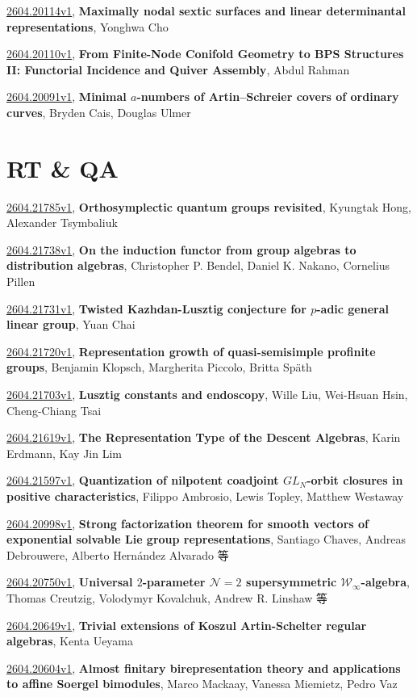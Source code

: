 \documentclass[9pt, a4paper]{article}
\theoremstyle{plain}
\theoremstyle{definition}
\theoremstyle{remark}
\newcommand{\arxiv}[3]{\href{https://arxiv.org/abs/#1}{#1}, \textbf{\textcolor{arxivblue}{#2}}, #3}
\begin{document}
\arxiv{2604.20114v1}{Maximally nodal sextic surfaces and linear determinantal representations}{Yonghwa Cho}

\arxiv{2604.20110v1}{From Finite-Node Conifold Geometry to BPS Structures II: Functorial Incidence and Quiver Assembly}{Abdul Rahman}

\arxiv{2604.20091v1}{Minimal $a$-numbers of Artin--Schreier covers of ordinary curves}{Bryden Cais, Douglas Ulmer}


\section{RT \& QA}
\arxiv{2604.21785v1}{Orthosymplectic quantum groups revisited}{Kyungtak Hong, Alexander Tsymbaliuk}

\arxiv{2604.21738v1}{On the induction functor from group algebras to distribution algebras}{Christopher P. Bendel, Daniel K. Nakano, Cornelius Pillen}

\arxiv{2604.21731v1}{Twisted Kazhdan-Lusztig conjecture for $p$-adic general linear group}{Yuan Chai}

\arxiv{2604.21720v1}{Representation growth of quasi-semisimple profinite groups}{Benjamin Klopsch, Margherita Piccolo, Britta Späth}

\arxiv{2604.21703v1}{Lusztig constants and endoscopy}{Wille Liu, Wei-Hsuan Hsin, Cheng-Chiang Tsai}

\arxiv{2604.21619v1}{The Representation Type of the Descent Algebras}{Karin Erdmann, Kay Jin Lim}

\arxiv{2604.21597v1}{Quantization of nilpotent coadjoint $GL_N$-orbit closures in positive characteristics}{Filippo Ambrosio, Lewis Topley, Matthew Westaway}

\arxiv{2604.20998v1}{Strong factorization theorem for smooth vectors of exponential solvable Lie group representations}{Santiago Chaves, Andreas Debrouwere, Alberto Hernández Alvarado 等}

\arxiv{2604.20750v1}{Universal $2$-parameter $\mathcal{N}=2$ supersymmetric $\mathcal{W}_{\infty}$-algebra}{Thomas Creutzig, Volodymyr Kovalchuk, Andrew R. Linshaw 等}

\arxiv{2604.20649v1}{Trivial extensions of Koszul Artin-Schelter regular algebras}{Kenta Ueyama}

\arxiv{2604.20604v1}{Almost finitary birepresentation theory and applications to affine Soergel bimodules}{Marco Mackaay, Vanessa Miemietz, Pedro Vaz}
\end{document}
